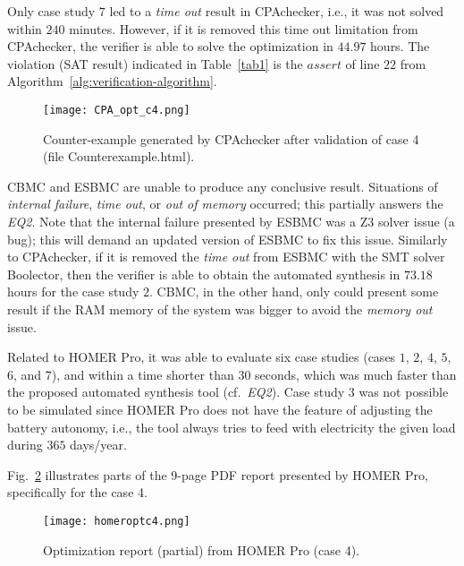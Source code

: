 Only case study $7$ led to a \textit{time out} result in CPAchecker, i.e., 
it was not solved within $240$ minutes. However, if it is removed 
this time out limitation from CPAchecker, the verifier is 
able to solve the optimization in $44.97$ hours. 
The violation (SAT result) indicated in Table~\ref{tab1} 
is the $assert$ of line $22$ from Algorithm~\ref{alg:verification-algorithm}. %

\begin{figure}[h]
\texttt{[image: CPA\_opt\_c4.png]}
\centering
\caption{Counter-example generated by CPAchecker after validation of case 4 (file Counterexample.html).}
\label{fig:CPAoptc1}
\end{figure}

CBMC and ESBMC are unable to produce any conclusive result. 
Situations of \textit{internal failure}, \textit{time out}, 
or \textit{out of memory} occurred; this partially answers 
the \textit{EQ2}. Note that the internal failure presented 
by ESBMC was a Z3 solver issue (a bug); this will demand 
an updated version of ESBMC to fix this issue. Similarly to CPAchecker, 
if it is removed the \textit{time out} from ESBMC with the SMT solver Boolector, 
then the verifier is able to obtain the automated synthesis 
in $73.18$ hours for the case study $2$. CBMC, in the other hand, only could present some result if the RAM memory of the system was bigger to avoid the \textit{memory out} issue.

Related to HOMER Pro, it was able to evaluate six case studies (cases $1$, $2$, $4$, $5$, $6$, and $7$), and within a time shorter than $30$ seconds, which was much 
faster than the proposed automated synthesis tool (cf.~\textit{EQ2}). 
Case study $3$ was not possible to be simulated since HOMER Pro 
does not have the feature of adjusting the battery autonomy, i.e., 
the tool always tries to feed with electricity the given load 
during $365$ days/year. 

Fig.~\ref{fig:homeroptc4} illustrates parts of the 9-page PDF report presented by HOMER Pro, specifically for the case 4.

\begin{figure}[h]
\texttt{[image: homeroptc4.png]}
\centering
\caption{Optimization report (partial) from HOMER Pro (case 4).}
\label{fig:homeroptc4}
\end{figure}

